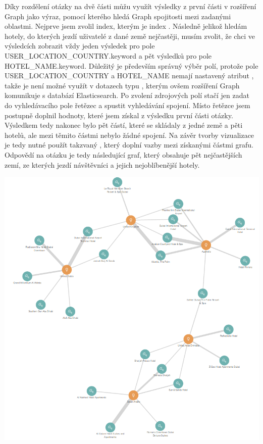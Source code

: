 \documentclass[czech,BP]{thesiskiv}
\begin{document}
\newpage
\noindent
Díky rozdělení otázky na dvě části můžu využít výsledky z první části v rozšíření Graph jako výraz, pomocí kterého hledá Graph spojitosti mezi zadanými oblastmi. Nejprve jsem zvolil index, kterým je index . Následně jelikož hledám hotely, do kterých jezdí uživatelé z dané země nejčastěji, musím zvolit, že chci ve výsledcích zobrazit vždy jeden výsledek pro pole USER\_LOCATION\_COUNTRY.keyword a pět výsledků pro pole HOTEL\_NAME.keyword. Důležitý je především správný výběr polí, protože pole USER\_LOCATION\_COUNTRY a HOTEL\_NAME nemají nastavený atribut , takže je není možné využít v dotazech typu , kterým ovšem rozšíření Graph komunikuje s databází Elasticsearch. Po zvolení zdrojových polí stačí jen zadat do vyhledávacího pole řetězec  a spustit vyhledávání spojení. Místo řetězce  jsem postupně doplnil hodnoty, které jsem získal z výsledku první části otázky. Výsledkem tedy nakonec bylo pět částí, které se skládaly z jedné země a pěti hotelů, ale mezi těmito částmi nebylo žádné spojení. Na závěr tvorby vizualizace je tedy nutné použít takzvaný , který doplní vazby mezi získanými částmi grafu. Odpovědí na otázku je tedy následující graf, který obsahuje pět nejčastějších zemí, ze kterých jezdí návštěvníci a jejich nejoblíbenější hotely.
\begin{center}
	\includegraphics[width = \textwidth]{img/5_countries_highest_appearance_graph.png}
\end{center}
\end{document}

